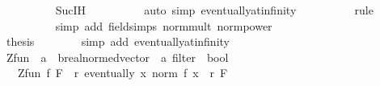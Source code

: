 \begin{isabellebody}
\ \ \ \ \ \ \ \ \isamarkupfalse%
\ Suc{\isachardot}{\kern0pt}IH\isanewline
\ \ \ \ \ \ \ \ \isamarkupfalse%
\ {\isacharparenleft}{\kern0pt}auto\ simp{\isacharcolon}{\kern0pt}\ eventually{\isacharunderscore}{\kern0pt}at{\isacharunderscore}{\kern0pt}infinity{\isacharparenright}{\kern0pt}\isanewline
\ \ \ \ \ \ \ \ \isamarkupfalse%
\ {\isacharparenleft}{\kern0pt}rule\ {\isacharasterisk}{\kern0pt}{\isacharparenright}{\kern0pt}\isanewline
\ \ \ \ \ \ \ \ \isamarkupfalse%
\ {\isacharparenleft}{\kern0pt}simp\ add{\isacharcolon}{\kern0pt}\ field{\isacharunderscore}{\kern0pt}simps\ norm{\isacharunderscore}{\kern0pt}mult\ norm{\isacharunderscore}{\kern0pt}power{\isacharparenright}{\kern0pt}\isanewline
\ \ \ \ \ \ \ \ \isamarkupfalse%
\isanewline
\ \ \ \ \isamarkupfalse%
\isanewline
\ \ \ \ \isamarkupfalse%
\ \isamarkupfalse%
\ {\isacharquery}{\kern0pt}thesis\isanewline
\ \ \ \ \ \ \isamarkupfalse%
\ {\isacharparenleft}{\kern0pt}simp\ add{\isacharcolon}{\kern0pt}\ eventually{\isacharunderscore}{\kern0pt}at{\isacharunderscore}{\kern0pt}infinity{\isacharparenright}{\kern0pt}\isanewline
\ \ \isamarkupfalse%
\isanewline
{}\isamarkupfalse%
%
\endisatagproof
{\isafoldproof}%
%
\isadelimproof
%
\endisadelimproof
%
\isadelimdocument
%
\endisadelimdocument
%
\isatagdocument
%
\isamarkuptrue%
%
\endisatagdocument
{\isafolddocument}%
%
\isadelimdocument
%
\endisadelimdocument
{}\isamarkupfalse%
\ Zfun\ {\isacharcolon}{\kern0pt}{\isacharcolon}{\kern0pt}\ {\isachardoublequoteopen}{\isacharparenleft}{\kern0pt}{\isacharprime}{\kern0pt}a\ {\isasymRightarrow}\ {\isacharprime}{\kern0pt}b{\isacharcolon}{\kern0pt}{\isacharcolon}{\kern0pt}real{\isacharunderscore}{\kern0pt}normed{\isacharunderscore}{\kern0pt}vector{\isacharparenright}{\kern0pt}\ {\isasymRightarrow}\ {\isacharprime}{\kern0pt}a\ filter\ {\isasymRightarrow}\ bool{\isachardoublequoteclose}\isanewline
\ \ \ {\isachardoublequoteopen}Zfun\ f\ F\ {\isacharequal}{\kern0pt}\ {\isacharparenleft}{\kern0pt}{\isasymforall}r{\isachargreater}{\kern0pt}{}{\isachardot}{\kern0pt}\ eventually\ {\isacharparenleft}{\kern0pt}{\isasymlambda}x{\isachardot}{\kern0pt}\ norm\ {\isacharparenleft}{\kern0pt}f\ x{\isacharparenright}{\kern0pt}\ {\isacharless}{\kern0pt}\ r{\isacharparenright}{\kern0pt}\ F{\isacharparenright}{\kern0pt}{\isachardoublequoteclose}\isanewline
\isanewline

\end{isabellebody}
